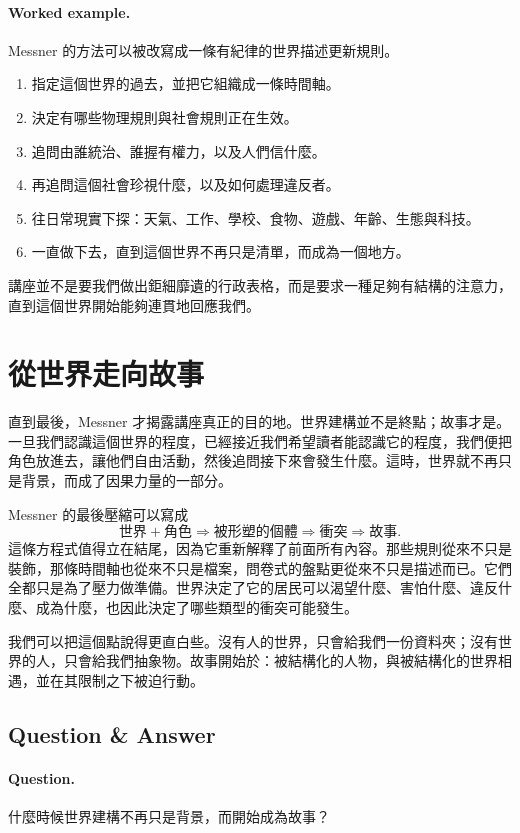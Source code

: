 \paragraph{Worked example.} Messner 的方法可以被改寫成一條有紀律的世界描述更新規則。
\begin{enumerate}
\item 指定這個世界的過去，並把它組織成一條時間軸。
\item 決定有哪些物理規則與社會規則正在生效。
\item 追問由誰統治、誰握有權力，以及人們信什麼。
\item 再追問這個社會珍視什麼，以及如何處理違反者。
\item 往日常現實下探：天氣、工作、學校、食物、遊戲、年齡、生態與科技。
\item 一直做下去，直到這個世界不再只是清單，而成為一個地方。
\end{enumerate}
講座並不是要我們做出鉅細靡遺的行政表格，而是要求一種足夠有結構的注意力，直到這個世界開始能夠連貫地回應我們。

\section{從世界走向故事}

直到最後，Messner 才揭露講座真正的目的地。世界建構並不是終點；故事才是。一旦我們認識這個世界的程度，已經接近我們希望讀者能認識它的程度，我們便把角色放進去，讓他們自由活動，然後追問接下來會發生什麼。這時，世界就不再只是背景，而成了因果力量的一部分。

Messner 的最後壓縮可以寫成
\begin{equation}
\text{世界} + \text{角色} \Rightarrow \text{被形塑的個體} \Rightarrow \text{衝突} \Rightarrow \text{故事}.
\end{equation}
這條方程式值得立在結尾，因為它重新解釋了前面所有內容。那些規則從來不只是裝飾，那條時間軸也從來不只是檔案，問卷式的盤點更從來不只是描述而已。它們全都只是為了壓力做準備。世界決定了它的居民可以渴望什麼、害怕什麼、違反什麼、成為什麼，也因此決定了哪些類型的衝突可能發生。

我們可以把這個點說得更直白些。沒有人的世界，只會給我們一份資料夾；沒有世界的人，只會給我們抽象物。故事開始於：被結構化的人物，與被結構化的世界相遇，並在其限制之下被迫行動。

\subsection{Question \& Answer}

\paragraph{Question.} 什麼時候世界建構不再只是背景，而開始成為故事？


